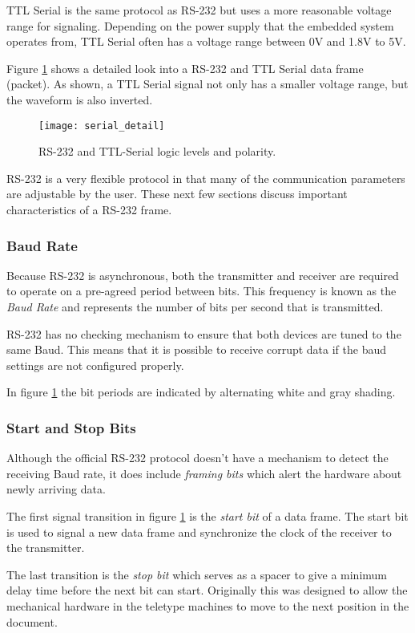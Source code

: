 \documentclass[11pt,fleqn]{book} %
\begin{document}
TTL Serial is the same protocol as RS-232 but uses a more reasonable voltage range for signaling. Depending on the power supply that the embedded system operates from, TTL Serial often has a voltage range between 0V and 1.8V to 5V. 

Figure \ref{serial_detail} shows a detailed look into a RS-232 and TTL Serial data frame (packet). As shown, a TTL Serial signal not only has a smaller voltage range, but the waveform is also inverted. 

\begin{figure}[]
    \centering\texttt{[image: serial\_detail]}
    \caption{RS-232 and TTL-Serial logic levels and polarity.}
    \label{serial_detail}
\end{figure}

RS-232 is a very flexible protocol in that many of the communication parameters are adjustable by the user. These next few sections discuss important characteristics of a RS-232 frame.  

\subsubsection{Baud Rate} 
Because RS-232 is asynchronous, both the transmitter and receiver are required to operate on a pre-agreed period between bits. This frequency is known as the \textit{Baud Rate} and represents the number of bits per second that is transmitted. 

RS-232 has no checking mechanism to ensure that both devices are tuned to the same Baud. This means that it is possible to receive corrupt data if the baud settings are not configured properly. 

In figure \ref{serial_detail} the bit periods are indicated by alternating white and gray shading. 
 
\subsubsection{Start and Stop Bits}
Although the official RS-232 protocol doesn't have a mechanism to detect the receiving Baud rate, it does include \textit{framing bits} which alert the hardware about newly arriving data. 

The first signal transition in figure \ref{serial_detail} is the \textit{start bit} of a data frame. The start bit is used to signal a new data frame and synchronize the clock of the receiver to the transmitter.   

The last transition is the \textit{stop bit} which serves as a spacer to give a minimum delay time before the next bit can start. Originally this was designed to allow the mechanical hardware in the teletype machines to move to the next position in the document.
\end{document}
